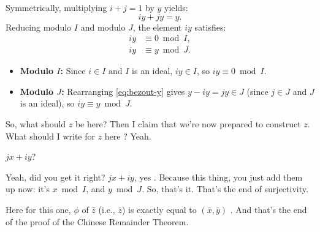 \begin{proofWrapper}
\begin{content}
Symmetrically, multiplying $i + j = 1$ by $y$ yields:
\begin{equation}\label{eq:bezout-y}
iy + jy = y.
\end{equation}
Reducing modulo $I$ and modulo $J$, the element $iy$ satisfies:
\begin{align}
iy &\equiv 0 \bmod I, \label{eq:iy-mod-i} \\
iy &\equiv y \bmod J. \label{eq:iy-mod-j}
\end{align}

\begin{steps}
\begin{itemize}
    \item \textbf{Modulo $I$:} Since $i \in I$ and $I$ is an ideal, $iy \in I$, so $iy \equiv 0 \bmod I$.
    \item \textbf{Modulo $J$:} Rearranging \eqref{eq:bezout-y} gives $y - iy = jy \in J$ (since $j \in J$ and $J$ is an ideal), so $iy \equiv y \bmod J$.
\end{itemize}
\end{steps}
\end{content}

\begin{speech}[00:12:49 - 00:12:57]
So, what should $z$ be here? Then I claim that we're now prepared to construct $z$. What should I write for $z$ here ? Yeah.
\end{speech}

\begin{student}
$jx + iy$?
\end{student}

\begin{speech}[00:12:57 - 00:13:25]
Yeah, did you get it right? $jx + iy$, yes . Because this thing, you just add them up now: it's $x \bmod I$, and $y \bmod J$. So, that's it. That's the end of surjectivity.

Here for this one, $\phi$ of $\hat{z}$ (i.e., $\bar{z}$) is exactly equal to $(\bar{x}, \bar{y})$ . And that's the end of the proof of the Chinese Remainder Theorem.
\end{speech}


\end{proofWrapper}
